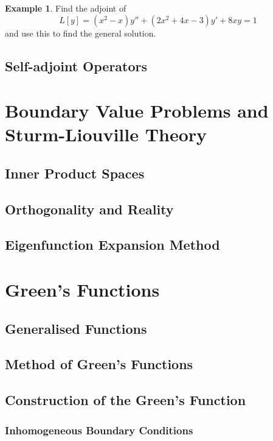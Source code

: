 \documentclass{article}
\theoremstyle{plain}
\theoremstyle{definition}
\newtheorem{exmp}{Example}[section]
\numberwithin{equation}{section}
\begin{document}
\begin{tcolorbox}
    \begin{exmp}
        Find the adjoint of 
        \[ L[y] = (x^2 - x)y'' + (2x^2 + 4x - 3)y' + 8xy = 1 \]
        and use this to find the general solution.
    \end{exmp}
\end{tcolorbox}

\subsection{Self-adjoint Operators}

\section{Boundary Value Problems and Sturm-Liouville Theory}

\subsection{Inner Product Spaces}

\subsection{Orthogonality and Reality}

\subsection{Eigenfunction Expansion Method}

\section{Green's Functions}

\subsection{Generalised Functions}

\subsection{Method of Green's Functions}

\subsection{Construction of the Green's Function}

\subsubsection{Inhomogeneous Boundary Conditions}
\end{document}
